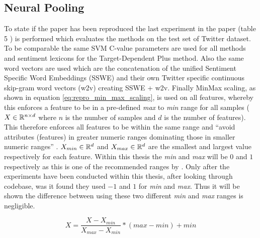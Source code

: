 \subsection{Neural Pooling}
\label{section:repro_neural_pooling}
To state if the paper \citep{vo2015target} has been reproduced the last experiment in the paper (table 5 \citep{vo2015target}) is performed which evaluates the methods on the test set of \citet{dong-etal-2014-adaptive} Twitter dataset. To be comparable the same SVM C-value parameters are used for all methods and sentiment lexicons for the Target-Dependent Plus method. Also the same word vectors are used which are the concatenation of the unified Sentiment Specific Word Embeddings (SSWE) \citep{tang-etal-2014-learning} and their own Twitter specific continuous skip-gram \citep{mikolov2013efficient} word vectors (w2v) creating SSWE + w2v. Finally MinMax scaling, as shown in equation \ref{eq:repro_min_max_scaling}, is used on all features, whereby this enforces a feature to be in a pre-defined \textit{max} to \textit{min} range for all samples ($X \in \mathbb{R}^{n \times d}$ where $n$ is the number of samples and $d$ is the number of features). This therefore enforces all features to be within the same range and ``avoid attributes (features) in greater numeric ranges dominating those in smaller numeric ranges'' \citep{hsu2003practical}. $X_{min} \in \mathbb{R}^d$ and $X_{max} \in \mathbb{R}^d$ are the smallest and largest value respectively for each feature. Within this thesis the \textit{min} and \textit{max} will be $0$ and $1$ respectively as this is one of the recommended ranges by \citet{hsu2003practical}. Only after the experiments have been conducted within this thesis, after looking through \citet{wang-etal-2017-tdparse} codebase, was it found they used $-1$ and $1$ for \textit{min} and \textit{max}. Thus it will be shown the difference between using these two different \textit{min} and \textit{max} ranges is negligible.

\begin{equation}
    X = \frac{X - X_{min}}{X_{max} - X_{min}} * (max - min) + min
    \label{eq:repro_min_max_scaling}
\end{equation}

